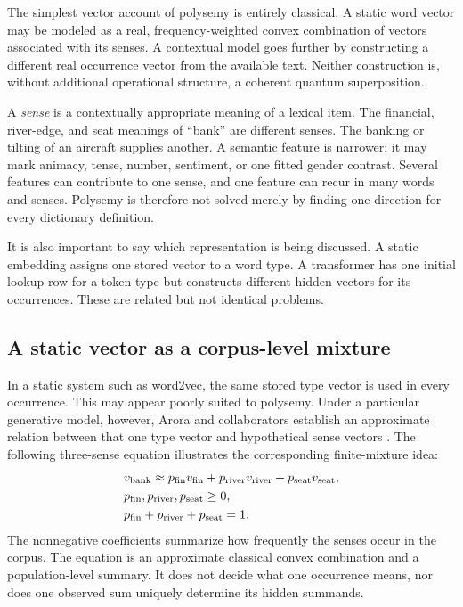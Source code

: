 \documentclass[
  aps,
  reprint,
  superscriptaddress,
  floatfix,
  nofootinbib,
  longbibliography
]{revtex4-2}
\begin{document}
The simplest vector account of polysemy is entirely classical.  A static word
vector may be modeled as a real, frequency-weighted convex combination of
vectors associated with its senses.  A contextual model goes further by
constructing a different real occurrence vector from the available text.
Neither construction is, without additional operational structure, a coherent
quantum superposition.

A \emph{sense} is a contextually appropriate meaning of a lexical item.  The
financial, river-edge, and seat meanings of ``bank'' are different senses.
The banking or tilting of an aircraft supplies another.  A semantic feature is
narrower: it may mark animacy, tense, number, sentiment, or one fitted gender
contrast.  Several features can contribute to one sense, and one feature can
recur in many words and senses.  Polysemy is therefore not solved merely by
finding one direction for every dictionary definition.

It is also important to say which representation is being discussed.  A
static embedding assigns one stored vector to a word type.  A transformer has
one initial lookup row for a token type but constructs different hidden
vectors for its occurrences.  These are related but not identical problems.

\subsection{A static vector as a corpus-level mixture}

In a static system such as word2vec, the same stored type vector is used in
every occurrence.  This may appear poorly suited to polysemy.  Under a
particular generative model, however, Arora and collaborators establish an
approximate relation between that one type vector and hypothetical sense
vectors \cite{arora-etal-2018-linear}.  The following three-sense equation
illustrates the corresponding finite-mixture idea:
\begin{equation}
\begin{aligned}
 &v_{\rm bank}\approx
 p_{\rm fin}v_{\rm fin}
 +p_{\rm river}v_{\rm river}
 +p_{\rm seat}v_{\rm seat},\\
 &p_{\rm fin},p_{\rm river},p_{\rm seat}\geq 0,\\
 &p_{\rm fin}+p_{\rm river}+p_{\rm seat}=1 .
\end{aligned}
 \label{eq:static-mixture-main}
\end{equation}
The nonnegative coefficients  summarize how frequently the senses occur in the
corpus.  The equation is an approximate classical convex combination and a
population-level summary.  It does not decide what one occurrence means, nor
does one observed sum uniquely determine its hidden summands.
\end{document}
